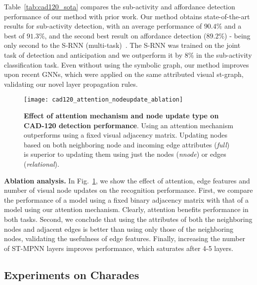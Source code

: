 \documentclass[runningheads]{llncs}
\begin{document}
Table~\ref{tab:cad120_sota} compares the sub-activity and affordance detection performance of our method with prior work. Our method obtains state-of-the-art results for sub-activity detection, with an average performance of $\mathbf{90.4}\%$ and a best of $\mathbf{91.3}\%$, and the second best result on affordance detection ($89.2\%$) - being only second to the S-RNN (multi-task)~\cite{Jain:CVPR16}. The S-RNN was trained on the joint task of detection and anticipation and we outperform it by $8\%$ in the sub-activity classification task. Even without using the symbolic graph, our method improves upon recent GNNs, which were applied on the same attributed visual st-graph, validating our novel layer propagation rules.
\begin{figure}[t]
   \centering\texttt{[image: cad120\_attention\_nodeupdate\_ablation]}
   \caption{\textbf{Effect of attention mechanism and node update type on CAD-120 detection performance}. Using an attention mechanism  outperforms using a fixed visual adjacency matrix. Updating nodes based on both neighboring node and incoming edge attributes (\emph{full}) is superior to updating them using just the nodes (\emph{nnode}) or edges (\emph{relational}).}
\label{fig:cad120_attention_ablation}
\end{figure}
\textbf{Ablation analysis.} In Fig.~\ref{fig:cad120_attention_ablation}, we show the effect of attention, edge features and number of visual node updates on the recognition performance. First, we compare the performance of a model using a fixed binary adjacency matrix with that of a model using our attention mechanism. Clearly, attention benefits performance in both tasks. Second, we conclude that using the attributes of both the neighboring nodes and adjacent edges is better than using only those of the neighboring nodes, validating the usefulness of edge features. Finally, increasing the number of ST-MPNN layers improves performance, which saturates after 4-5 layers. 


\subsection{Experiments on Charades}
\label{subsec:charades}
\end{document}
